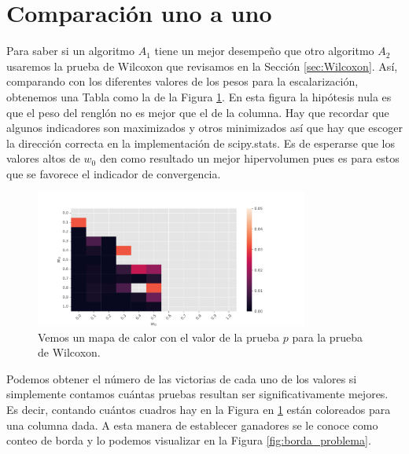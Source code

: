 \section*{Comparación uno a uno}
Para saber si un algoritmo $A_1$ tiene un mejor desempeño que otro algoritmo $A_2$ usaremos la prueba de Wilcoxon que revisamos en la Sección \ref{sec:Wilcoxon}. Así, comparando con los diferentes valores de los pesos para la escalarización, obtenemos una Tabla como la de la Figura \ref{fig:heat}. En esta figura la hipótesis nula es que el peso del renglón no es mejor que el de la columna. Hay que recordar que algunos indicadores son maximizados y otros minimizados así que hay que escoger la dirección correcta en la implementación de scipy.stats. Es de esperarse que los valores altos de $w_0$ den como resultado un mejor hipervolumen pues es para estos que se favorece el indicador de convergencia.

\begin{figure} [H]
    \centering
    \includegraphics[width=0.8\textwidth]{Figuras/Heatmap_WFG4_obj3_hv_indconv_IGD+.pdf}
    \caption[Heatmap Wilcoxon]{Vemos un mapa de calor con el valor de la prueba $p$ para la prueba de Wilcoxon. }
    \label{fig:heat}
\end{figure}

Podemos obtener el número de las victorias de cada uno de los valores si simplemente contamos cuántas pruebas resultan ser significativamente mejores. Es decir, contando cuántos cuadros hay en la Figura en \ref{fig:heat} están coloreados para una columna dada. A esta manera de establecer ganadores se le conoce como conteo de borda y lo podemos visualizar en la Figura \ref{fig:borda_problema}.


